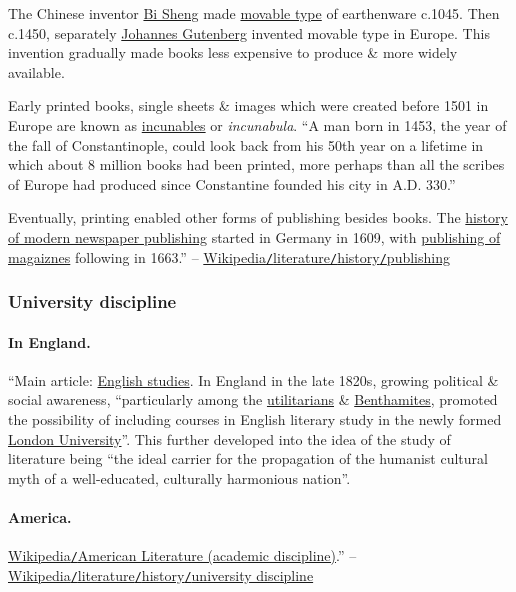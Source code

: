 \documentclass[oneside]{book}
\numberwithin{equation}{section}
\begin{document}
The Chinese inventor \href{https://en.wikipedia.org/wiki/Bi_Sheng}{Bi Sheng} made \href{https://en.wikipedia.org/wiki/Movable_type}{movable type} of earthenware c.1045. Then c.1450, separately \href{https://en.wikipedia.org/wiki/Johannes_Gutenberg}{Johannes Gutenberg} invented movable type in Europe. This invention gradually made books less expensive to produce \& more widely available.

Early printed books, single sheets \& images which were created before 1501 in Europe are known as \href{https://en.wikipedia.org/wiki/Incunable}{incunables} or \textit{incunabula}. ``A man born in 1453, the year of the fall of Constantinople, could look back from his 50th year on a lifetime in which about 8 million books had been printed, more perhaps than all the scribes of Europe had produced since Constantine founded his city in A.D. 330.''

Eventually, printing enabled other forms of publishing besides books. The \href{https://en.wikipedia.org/wiki/History_of_newspaper_publishing}{history of modern newspaper publishing} started in Germany in 1609, with \href{https://en.wikipedia.org/wiki/Magazine#History}{publishing of magaiznes} following in 1663.'' -- \href{https://en.wikipedia.org/wiki/Literature#Publishing}{Wikipedia\texttt{/}literature\texttt{/}history\texttt{/}publishing}

\subsubsection{University discipline}

\paragraph{In England.} ``Main article: \href{https://en.wikipedia.org/wiki/English_studies}{English studies}. In England in the late 1820s, growing political \& social awareness, ``particularly among the \href{https://en.wikipedia.org/wiki/Utilitarians}{utilitarians} \& \href{https://en.wikipedia.org/wiki/Jeremy_Bentham}{Benthamites}, promoted the possibility of including courses in English literary study in the newly formed \href{https://en.wikipedia.org/wiki/London_University}{London University}''. This further developed into the idea of the study of literature being ``the ideal carrier for the propagation of the humanist cultural myth of a well-educated, culturally harmonious nation''.

\paragraph{America.} \href{https://en.wikipedia.org/wiki/American_Literature_(academic_discipline)}{Wikipedia\texttt{/}American Literature (academic discipline)}.'' -- \href{https://en.wikipedia.org/wiki/Literature#University_discipline}{Wikipedia\texttt{/}literature\texttt{/}history\texttt{/}university discipline}
\end{document}

